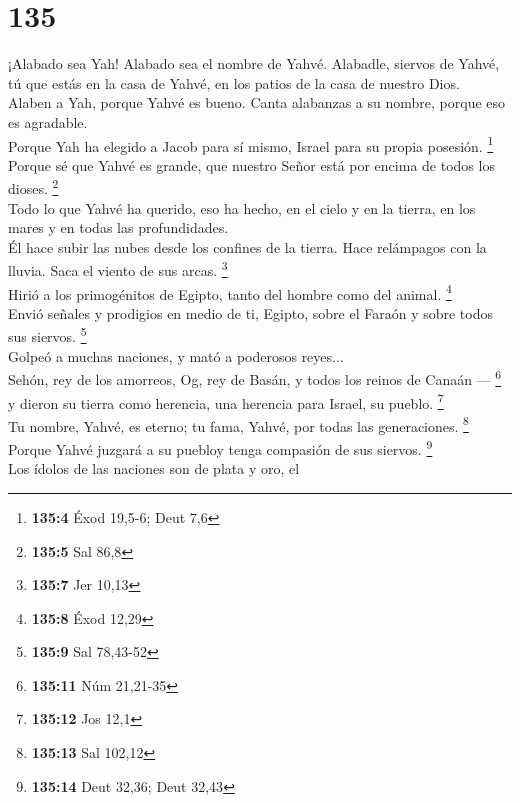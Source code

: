 \hypertarget{section-132}{%
\section{135}\label{section-132}}

 ¡Alabado sea Yah! Alabado sea el nombre de Yahvé.
Alabadle, siervos de Yahvé,\\
 tú que estás en la casa de Yahvé, en los patios de la
casa de nuestro Dios.\\
 Alaben a Yah, porque Yahvé es bueno. Canta alabanzas a su
nombre, porque eso es agradable.\\
 Porque Yah ha elegido a Jacob para sí mismo, Israel para
su propia posesión. \footnote{\textbf{135:4} Éxod 19,5-6; Deut 7,6}\\
 Porque sé que Yahvé es grande, que nuestro Señor está por
encima de todos los dioses. \footnote{\textbf{135:5} Sal 86,8}\\
 Todo lo que Yahvé ha querido, eso ha hecho, en el cielo y
en la tierra, en los mares y en todas las profundidades.\\
 Él hace subir las nubes desde los confines de la tierra.
Hace relámpagos con la lluvia. Saca el viento de sus arcas.
\footnote{\textbf{135:7} Jer 10,13}\\
 Hirió a los primogénitos de Egipto, tanto del hombre como
del animal. \footnote{\textbf{135:8} Éxod 12,29}\\
 Envió señales y prodigios en medio de ti, Egipto, sobre
el Faraón y sobre todos sus siervos. \footnote{\textbf{135:9} Sal
  78,43-52}\\
 Golpeó a muchas naciones, y mató a poderosos reyes...\\
 Sehón, rey de los amorreos, Og, rey de Basán, y todos
los reinos de Canaán --- \footnote{\textbf{135:11} Núm 21,21-35}\\
 y dieron su tierra como herencia, una herencia para
Israel, su pueblo. \footnote{\textbf{135:12} Jos 12,1}\\
 Tu nombre, Yahvé, es eterno; tu fama, Yahvé, por todas
las generaciones. \footnote{\textbf{135:13} Sal 102,12}\\
 Porque Yahvé juzgará a su puebloy tenga compasión de sus
siervos. \footnote{\textbf{135:14} Deut 32,36; Deut 32,43}\\
 Los ídolos de las naciones son de plata y oro, el
